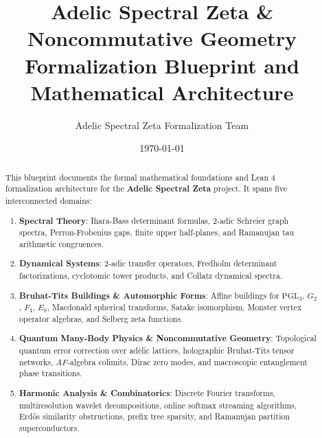 \documentclass[11pt,a4paper]{report}
\title{Adelic Spectral Zeta \& Noncommutative Geometry \\ \Large Formalization Blueprint and Mathematical Architecture}
\author{Adelic Spectral Zeta Formalization Team}
\date{\today}
\begin{document}
\maketitle

\begin{abstract}
This blueprint documents the formal mathematical foundations and Lean 4 formalization architecture for the \textbf{Adelic Spectral Zeta} project. It spans five interconnected domains:
\begin{enumerate}
    \item \textbf{Spectral Theory}: Ihara-Bass determinant formulas, 2-adic Schreier graph spectra, Perron-Frobenius gaps, finite upper half-planes, and Ramanujan tau arithmetic congruences.
    \item \textbf{Dynamical Systems}: 2-adic transfer operators, Fredholm determinant factorizations, cyclotomic tower products, and Collatz dynamical spectra.
    \item \textbf{Bruhat-Tits Buildings \& Automorphic Forms}: Affine buildings for $\mathrm{PGL}_3$, $G_2$, $F_4$, $E_8$, Macdonald spherical transforms, Satake isomorphism, Monster vertex operator algebras, and Selberg zeta functions.
    \item \textbf{Quantum Many-Body Physics \& Noncommutative Geometry}: Topological quantum error correction over adèlic lattices, holographic Bruhat-Tits tensor networks, $AF$-algebra colimits, Dirac zero modes, and macroscopic entanglement phase transitions.
    \item \textbf{Harmonic Analysis \& Combinatorics}: Discrete Fourier transforms, multiresolution wavelet decompositions, online softmax streaming algorithms, Erd\H{o}s similarity obstructions, prefix tree sparsity, and Ramanujan partition superconductors.
\end{enumerate}
\end{abstract}

\tableofcontents






\end{document}
